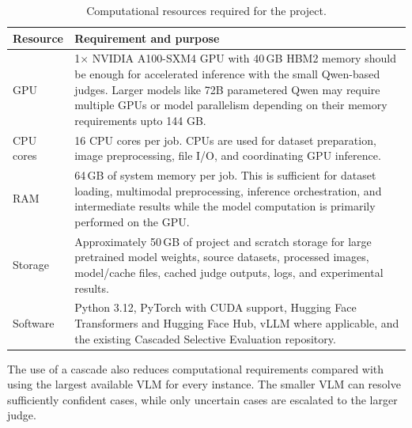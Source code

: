 \documentclass[11pt,a4paper]{article}
\begin{document}


\begin{table}[H]
\centering
\small
\caption{Computational resources required for the project.}
\begin{tabularx}{\textwidth}{@{}>{\raggedright\arraybackslash}p{}Y@{}}
\toprule
\textbf{Resource} & \textbf{Requirement and purpose} \\
\midrule

GPU &
1$\times$ NVIDIA A100-SXM4 GPU with 40\,GB HBM2 memory should be enough for accelerated
inference with the small Qwen-based judges. Larger models like 72B parametered Qwen may require multiple
GPUs or model parallelism depending on their memory requirements upto 144 GB. \\

CPU cores &
16 CPU cores per job. CPUs are used for dataset preparation,
image preprocessing, file I/O, and coordinating GPU inference. \\

RAM &
64\,GB of system memory per job. This is sufficient for dataset loading,
multimodal preprocessing, inference orchestration, and intermediate
results while the model computation is primarily performed on the GPU. \\

Storage &
Approximately 50\,GB of project and scratch storage for large pretrained model weights, source datasets,
processed images, model/cache files, cached judge outputs, logs, and
experimental results. \\

Software &
Python 3.12, PyTorch with CUDA support, Hugging Face Transformers and
Hugging Face Hub, vLLM where applicable, and the existing Cascaded
Selective Evaluation repository. \\

\bottomrule
\end{tabularx}
\end{table}

The use of a cascade also reduces computational requirements compared with
using the largest available VLM for every instance. The smaller VLM can
resolve sufficiently confident cases, while only uncertain cases are
escalated to the larger judge.
\end{document}
